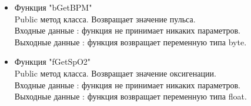\documentclass[a4document]{article}
\begin{document}
{\begin{itemize}
\begin{itemize}
                Выходные данные : функция возвращает объект класса String.
            \item Функция "bGetBPM" \\
                Public метод класса. Возвращает значение пульса. \\
                Входные данные : функция не принимает никаких параметров. \\
                Выходные данные : функция возвращает переменную типа byte.
            \item Функция "fGetSpO2" \\
                Public метод класса. Возвращает значение оксигенации. \\
                Входные данные : функция не принимает никаких параметров. \\
                Выходные данные : функция возвращает переменную типа float.
        \end{itemize}
        

\end{itemize}}
\end{document}
